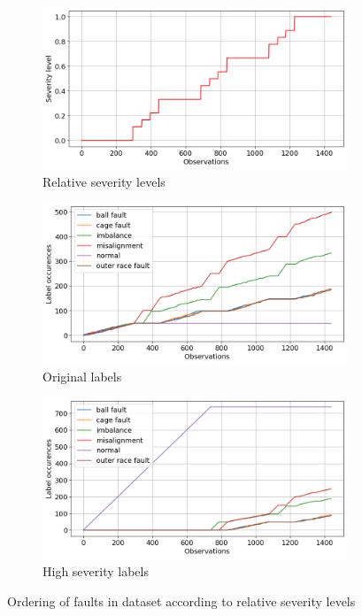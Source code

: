 \begin{figure}[ht]
    \centering
    \begin{subfigure}[b]{0.32\textwidth}
        \includegraphics[width=\textwidth]{assets/results/incremental-learning/severity-levels.png}
        \caption{Relative severity levels}
        \label{fig:design:online-count-severity-level}
    \end{subfigure}
    \hfill
    \begin{subfigure}[b]{0.32\textwidth}
        \includegraphics[width=\textwidth]{assets/results/incremental-learning/order-natural.png}
        \caption{Original labels}
        \label{fig:design:online-event-order}
    \end{subfigure}
    \hfill
    \begin{subfigure}[b]{0.32\textwidth}
        \includegraphics[width=\textwidth]{assets/results/incremental-learning/order-severity.png}
        \caption{High severity labels}
         \label{fig:design:online-event-order-severity}
    \end{subfigure}
    \caption{Ordering of faults in dataset according to relative severity levels}
\end{figure}

